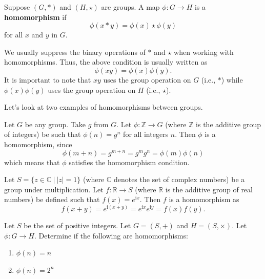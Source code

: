 \begin{definition}
    Suppose $(G, \ast)$ and $(H, \star)$ are groups. A map $\phi: G \to H$ is a \textbf{homomorphism} if
    \[
        \phi(x \ast y) = \phi(x) \star \phi(y)
    \]
    for all $x$ and $y$ in $G$.
\end{definition}
\begin{remark}
    We usually suppress the binary operations of $\ast$ and $\star$ when working with homomorphisms. Thus, the above condition is usually written as
    \[
        \phi(xy) = \phi(x)\phi(y)    .
    \]
    It is important to note that $xy$ uses the group operation on $G$ (i.e., $\ast$) while $\phi(x)\phi(y)$ uses the group operation on $H$ (i.e., $\star$).
\end{remark}



Let's look at two examples of homomorphisms between groups.
\begin{example}
    Let $G$ be any group. Take $g$ from $G$. Let $\phi: \mathbb{Z} \to G$ (where $\mathbb{Z}$ is the additive group of integers) be such that $\phi(n) = g^n$ for all integers $n$. Then $\phi$ is a homomorphism, since
    \[
        \phi(m + n) = g^{m+n} = g^m g^n = \phi(m)\phi(n)
    \]
    which means that $\phi$ satisfies the homomorphism condition.
\end{example}

\begin{example}
    Let $S = \{z \in \mathbb{C} \ | \ |z| = 1\}$ (where $\mathbb{C}$ denotes the set of complex numbers) be a group under multiplication. Let $f: \mathbb{R} \to S$ (where $\mathbb{R}$ is the additive group of real numbers) be defined such that $f(x) = e^{\mathrm{i}x}$. Then $f$ is a homomorphism as
    \[
        f(x + y) = e^{\mathrm{i}(x+y)} = e^{\mathrm{i}x} e^{\mathrm{i}y} = f(x)f(y).
    \]
\end{example}

\begin{exercise}
    Let $S$ be the set of positive integers. Let $G = (S, +)$ and $H = (S, \times)$. Let $\phi: G \to H$. Determine if the following are homomorphisms:
    \begin{enumerate}[label=(\alph*)]
        \item $\phi(n) = n$
        \item $\phi(n) = 2^n$
    \end{enumerate}
\end{exercise}



